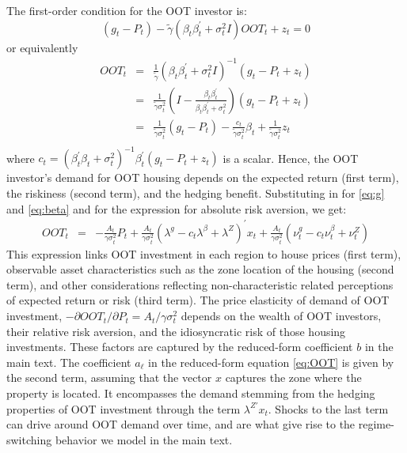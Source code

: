 \documentclass[letterpaper,12pt,dvipsnames,usenames]{article}
\theoremstyle{definition}
\begin{document}
\begin{spacing}{1.0}
\begin{small}
The first-order condition for the OOT investor is:
\[ (g_t-P_t)- \tilde \gamma (\beta_{t} \beta_t^{\prime} + \sigma_{t}^2 I)OOT_t+z_t= 0\]
or equivalently
\begin{eqnarray}
OOT_t &=& \frac{1}{\tilde \gamma}\left(\beta_{t} \beta_t^{\prime} + \sigma_{t}^2 I\right)^{-1} \left(g_t-P_t+z_t\right) \\
&=& \frac{1}{\tilde \gamma \sigma_{t}^2}\left(I - \frac{\beta_{t} \beta_t^{\prime} }{\beta_{t} \beta_t^{\prime} +\sigma_{t}^2} \right) \left(g_t-P_t+z_t\right) \\
&=& \frac{1}{\tilde \gamma \sigma_{t}^2}\left(g_t-P_t\right) -\frac{c_{t}}{\tilde \gamma \sigma_{t}^2}\beta_{t} +\frac{1}{\tilde \gamma \sigma_t^2}z_t\\
\end{eqnarray}
where $c_{t}=(\beta_{t}^{\prime} \beta_t +\sigma_{t}^2)^{-1} \beta_t^{\prime}(g_t-P_t+z_t)$ is a scalar.
Hence, the OOT investor's demand for OOT housing depends on the expected return (first term), the riskiness (second term), and the hedging benefit. Substituting in for \eqref{eq:g} and \eqref{eq:beta} and for the expression for absolute risk aversion, we get:
\begin{eqnarray}
OOT_t &=&  -\frac{A_t}{ \gamma \sigma_{t}^2} P_t +\frac{A_t}{ \gamma \sigma_{t}^2}\left(\lambda^g-c_t\lambda^{\beta}+\lambda^Z\right)^{\prime}x_t+\frac{A_t}{ \gamma \sigma_{t}^2}\left(\nu^g_t - c_t \nu_{t}^{\beta}+\nu_{t}^Z\right)
\end{eqnarray}
This expression links OOT investment in each region to house prices (first term), observable asset characteristics such as the zone location of the housing (second term), and other considerations reflecting non-characteristic related perceptions of expected return or risk (third term). The price elasticity of demand of OOT investment, $-\partial OOT_{t}/\partial P_t=A_t/\gamma \sigma_{t}^2$ depends on the wealth of OOT investors, their relative risk aversion, and the idiosyncratic risk of those housing investments. These factors are captured by the reduced-form coefficient $b$ in the main text. The coefficient $a_{\ell}$ in the reduced-form equation \eqref{eq:OOT} is given by the second term, assuming that the vector $x$ captures the zone where the property is located. It encompasses the demand stemming from the hedging properties of OOT investment through the term $\lambda^{Z'}x_t$. Shocks to the last term can drive around OOT demand over time, and are what give rise to the regime-switching behavior we model in the main text.



\end{small}
\end{spacing}
\end{document}
